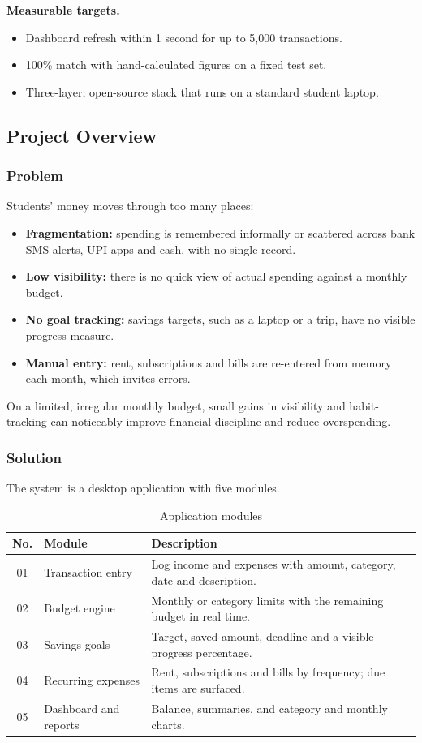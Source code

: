 \documentclass[12pt,a4paper]{article}
\begin{document}
\textbf{Measurable targets.}
\begin{itemize}
  \item Dashboard refresh within 1 second for up to 5,000 transactions.
  \item 100\% match with hand-calculated figures on a fixed test set.
  \item Three-layer, open-source stack that runs on a standard student laptop.
\end{itemize}

\subsection{Project Overview}

\subsubsection{Problem}
Students' money moves through too many places:
\begin{itemize}
  \item \textbf{Fragmentation:} spending is remembered informally or scattered across bank SMS alerts, UPI apps and cash, with no single record.
  \item \textbf{Low visibility:} there is no quick view of actual spending against a monthly budget.
  \item \textbf{No goal tracking:} savings targets, such as a laptop or a trip, have no visible progress measure.
  \item \textbf{Manual entry:} rent, subscriptions and bills are re-entered from memory each month, which invites errors.
\end{itemize}
On a limited, irregular monthly budget, small gains in visibility and habit-tracking can noticeably improve financial discipline and reduce overspending.

\subsubsection{Solution}
The system is a desktop application with five modules.

\begin{table}[H]
\centering
\caption{Application modules}
\begin{tabularx}{\textwidth}{@{}cp{4.3cm}X@{}}
  \toprule
  \textbf{No.} & \textbf{Module} & \textbf{Description}\\
  \midrule
  01 & Transaction entry & Log income and expenses with amount, category, date and description.\\
  02 & Budget engine & Monthly or category limits with the remaining budget in real time.\\
  03 & Savings goals & Target, saved amount, deadline and a visible progress percentage.\\
  04 & Recurring expenses & Rent, subscriptions and bills by frequency; due items are surfaced.\\
  05 & Dashboard and reports & Balance, summaries, and category and monthly charts.\\
  \bottomrule
\end{tabularx}
\end{table}
\end{document}
